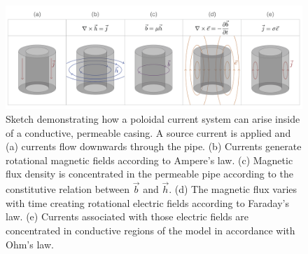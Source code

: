 \begin{figure}
    \begin{center}
    \includegraphics[width=\textwidth]{figures/casing-mu-sketch.png}
    \end{center}
\caption{
    Sketch demonstrating how a poloidal current system can arise inside of a conductive, permeable casing.
    A source current is applied and (a) currents flow downwards through the pipe. (b) Currents generate rotational magnetic fields according
    to Ampere's law. (c) Magnetic flux density is concentrated in the permeable pipe according to the constitutive relation between $\vec{b}$ and $\vec{h}$.
    (d) The magnetic flux varies with time creating rotational electric fields according to Faraday's law.
    (e) Currents associated with those electric fields are concentrated in conductive regions of the model in accordance with Ohm's law.
}
\label{fig:casing-mu-sketch}
\end{figure}



